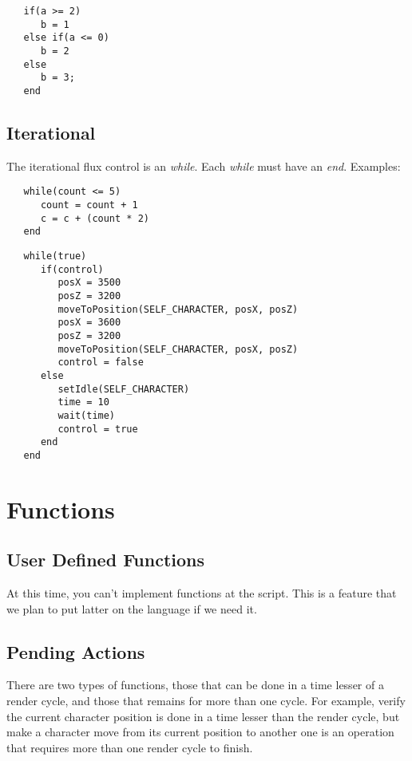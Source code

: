 \documentclass[ letterpaper,12pt]{article}
\begin{document}
\begin{verbatim}
   if(a >= 2)
      b = 1
   else if(a <= 0)
      b = 2
   else
      b = 3;
   end
\end{verbatim}

\subsection{Iterational}

The iterational flux control is an {\it while}. Each {\it while} must have an
{\it end}. Examples:

\begin{verbatim}
   while(count <= 5)
      count = count + 1
      c = c + (count * 2)
   end
\end{verbatim}

\begin{verbatim}
   while(true)
      if(control)
         posX = 3500
         posZ = 3200
         moveToPosition(SELF_CHARACTER, posX, posZ)
         posX = 3600
         posZ = 3200
         moveToPosition(SELF_CHARACTER, posX, posZ)
         control = false
      else
         setIdle(SELF_CHARACTER)
         time = 10
         wait(time)
         control = true
      end
   end
\end{verbatim}


\section{Functions}


\subsection{User Defined Functions}

   At this time, you can't implement functions at the script. This is a feature
that we plan to put latter on the language if we need it.

\subsection{Pending Actions}

   There are two types of functions, those that can be done in a time lesser of
a render cycle, and those that remains for more than one cycle. For example,
verify the current character position is done in a time lesser than the render
cycle, but make a character move from its current position to another one is an
operation that requires more than one render cycle to finish.
\end{document}
